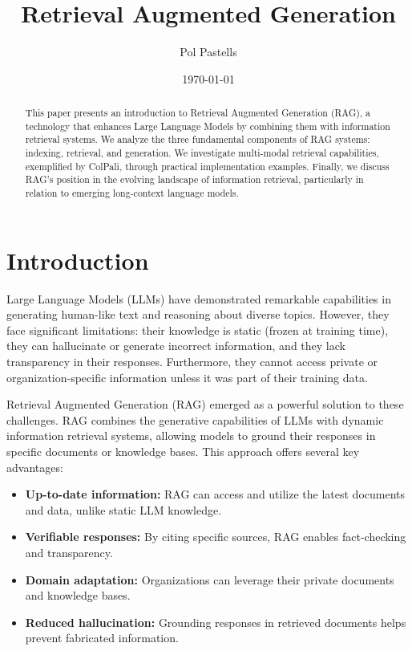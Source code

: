 \documentclass[notoc, tikz]{tufte-handout}
\title{Retrieval Augmented Generation}
\author[]{Pol Pastells}
\date{\today}  %
\begin{document}
\maketitle

\begin{abstract}
\noindent This paper presents an introduction to Retrieval Augmented Generation (RAG), a technology that enhances Large Language Models by combining them with information retrieval systems. We analyze the three fundamental components of RAG systems: indexing, retrieval, and generation. We investigate multi-modal retrieval capabilities, exemplified by ColPali, through practical implementation examples. Finally, we discuss RAG's position in the evolving landscape of information retrieval, particularly in relation to emerging long-context language models.
\end{abstract}



\tableofcontents


\section{Introduction}

Large Language Models (LLMs) have demonstrated remarkable capabilities in generating human-like text and reasoning about diverse topics. However, they face significant limitations: their knowledge is static (frozen at training time), they can hallucinate or generate incorrect information, and they lack transparency in their responses. Furthermore, they cannot access private or organization-specific information unless it was part of their training data.

Retrieval Augmented Generation (RAG) emerged as a powerful solution to these challenges. RAG combines the generative capabilities of LLMs with dynamic information retrieval systems, allowing models to ground their responses in specific documents or knowledge bases. This approach offers several key advantages:

\begin{itemize}
    \item \textbf{Up-to-date information:} RAG can access and utilize the latest documents and data, unlike static LLM knowledge.
    \item \textbf{Verifiable responses:} By citing specific sources, RAG enables fact-checking and transparency.
    \item \textbf{Domain adaptation:} Organizations can leverage their private documents and knowledge bases.
    \item \textbf{Reduced hallucination:} Grounding responses in retrieved documents helps prevent fabricated information.
\end{itemize}
\end{document}
